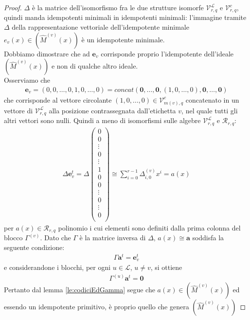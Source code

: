 \begin{proof}
   $\Delta$ è la matrice dell'isomorfismo fra le due strutture isomorfe $\mathcal{V}_{r, q}^{\mathscr{L}}$ e $\mathcal{V}_{r, q}^{c}$, quindi manda idempotenti minimali in idempotenti minimali: l'immagine tramite $\Delta$ della rappresentazione vettoriale dell'idempotente minimale $e_{v}(x) \in (\hat{M}^{(v)}(x))$ è un idempotente minimale.\\
   Dobbiamo dimostrare che ad $\mathbf{e}_{v}$ corrisponde proprio l'idempotente dell'ideale $(\hat{M}^{(v)}(x))$ e non di qualche altro ideale.\\
   Osserviamo che
   \begin{align*}
      \mathbf{e}_{v} = (0,0,\dots, 0, 1, 0 , \dots, 0) 
                     = concat(\mathbf{0}, \dots ,\mathbf{0},(1,0,\dots,0), \mathbf{0}, \dots ,\mathbf{0})   
   \end{align*}
   che corrisponde al vettore circolante $(1,0,\dots,0) \in \mathcal{V}_{m(v), q}^{c}$ concatenato in un vettore di $\mathcal{V}_{r, q}^{\mathscr{L}}$ alla posizione contrassegnata dall'etichetta $v$, nel quale tutti gli altri vettori sono nulli. 
   Quindi a meno di isomorfismi sulle algebre $\mathcal{V}_{r, q}^{\mathscr{L}}$ e $\mathcal{R}_{r,q}$:
   \begin{align*}
      \Delta \mathbf{e}_{v}^{t} = 
      \Delta
      \left(
      \begin{array} { c }
      0  \\
      \hline
      0   \\
      \vdots  \\
      0   \\
      \hline
      \vdots \\
      \hline
      1   \\
      0   \\
      0  \\
      \hline
      \vdots \\
      \hline
      0   \\
      \vdots  \\
      0   \\
      \end{array}
      \right)
      \cong
      \sum_{i=0}^{r-1} \Delta_{i,0}^{(v)} x^{i} = a(x)
   \end{align*}
    per $a(x) \in \mathcal{R}_{r,q}$ polinomio i cui elementi sono definiti dalla prima colonna del blocco $\Gamma^{(v)}$. Dato che $\Gamma$ è la matrice inversa di $\Delta$, $a(x)\cong \mathbf{a}$ soddisfa la seguente condizione:
    \begin{align*}
       \Gamma \mathbf{a}^{t} = \mathbf{e}_{v}^{t}
    \end{align*}
    e considerandone i blocchi, per ogni $u \in \mathscr{L}$, $u \neq v$, si ottiene
    \begin{align*}
       \Gamma^{(u)} \mathbf{a}^{t} = \mathbf{0}
    \end{align*}
    Pertanto dal lemma \ref{le:codiciEdGamma} segue che $a(x) \in (\hat{M}^{(v)}(x))$ ed essendo un idempotente primitivo, è proprio quello che genera $ (\hat{M}^{(v)}(x))$
\end{proof}

